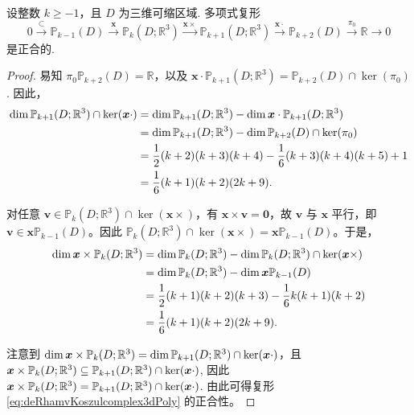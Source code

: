 \begin{lemma}\label{lem:Koszul}
设整数 $k\geq-1$，且 $D$ 为三维可缩区域.
多项式复形
\begin{equation}\label{eq:deRhamvKoszulcomplex3dPoly}
0\xrightarrow{\subset}\mathbb P_{k-1}(D) \xrightarrow{\boldsymbol x} \mathbb P_k(D; \mathbb R^3) \xrightarrow{\boldsymbol x\times} \mathbb P_{k+1}(D; \mathbb R^3)\xrightarrow{\boldsymbol x\cdot} \mathbb P_{k+2}(D)\xrightarrow{\pi_{0}}\mathbb {R}\xrightarrow{}0
\end{equation}
是正合的.  
\end{lemma}
\begin{proof}
易知 $\pi_0\mathbb P_{k+2}(D)=\mathbb R$，以及 $\boldsymbol x\cdot\mathbb P_{k+1}(D; \mathbb R^3)=\mathbb P_{k+2}(D)\cap\ker(\pi_0)$. 因此，
\begin{align*}
\dim\mathbb P_{k+1}(D; \mathbb R^3)\cap\ker(\boldsymbol x\cdot)&=\dim\mathbb P_{k+1}(D; \mathbb R^3)-\dim\boldsymbol x\cdot\mathbb P_{k+1}(D; \mathbb R^3) \\
&=\dim\mathbb P_{k+1}(D; \mathbb R^3)-\dim\mathbb P_{k+2}(D)\cap\ker(\pi_0) \\
&=\frac{1}{2}(k+2)(k+3)(k+4) - \frac{1}{6}(k+3)(k+4)(k+5) + 1 \\
&=\frac{1}{6}(k+1)(k+2)(2k+9).
\end{align*}

对任意 $\boldsymbol v\in\mathbb P_{k}(D; \mathbb R^3)\cap\ker(\boldsymbol x\times)$，有 $\boldsymbol x\times\boldsymbol v=\boldsymbol 0$，故 $\boldsymbol v$ 与 $\boldsymbol x$ 平行，即 $\boldsymbol v\in\boldsymbol x\mathbb P_{k-1}(D)$。因此 $\mathbb P_{k}(D; \mathbb R^3)\cap\ker(\boldsymbol x\times)=\boldsymbol x\mathbb P_{k-1}(D)$。于是，
\begin{align*}
\dim\boldsymbol x\times\mathbb P_{k}(D; \mathbb R^3)&=\dim\mathbb P_{k}(D; \mathbb R^3)-\dim\mathbb P_{k}(D; \mathbb R^3)\cap\ker(\boldsymbol x\times) \\
&=\dim\mathbb P_{k}(D; \mathbb R^3)-\dim\boldsymbol x\mathbb P_{k-1}(D) \\
&=\frac{1}{2}(k+1)(k+2)(k+3) - \frac{1}{6}k(k+1)(k+2) \\
&=\frac{1}{6}(k+1)(k+2)(2k+9).
\end{align*}

注意到 $\dim\boldsymbol x\times\mathbb P_{k}(D; \mathbb R^3)=\dim\mathbb P_{k+1}(D; \mathbb R^3)\cap\ker(\boldsymbol x\cdot)$，且 $\boldsymbol x\times\mathbb P_{k}(D; \mathbb R^3)\subseteq\mathbb P_{k+1}(D; \mathbb R^3)\cap\ker(\boldsymbol x\cdot)$, 因此 $\boldsymbol x\times\mathbb P_{k}(D; \mathbb R^3)=\mathbb P_{k+1}(D; \mathbb R^3)\cap\ker(\boldsymbol x\cdot)$.
由此可得复形 \eqref{eq:deRhamvKoszulcomplex3dPoly} 的正合性。
\end{proof}

